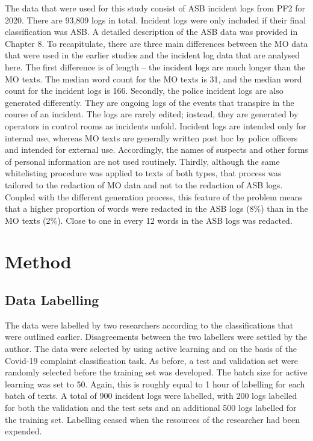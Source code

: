 The data that were used for this study consist of ASB incident logs from PF2 for 2020. There are 93,809 logs in total. Incident logs were only included if their final classification was ASB. A detailed description of the ASB data was provided in Chapter 8. To recapitulate, there are three main differences between the MO data that were used in the earlier studies and the incident log data that are analysed here. The first difference is of length – the incident logs are much longer than the MO texts. The median word count for the MO texts is 31, and the median word count for the incident logs is 166. Secondly, the police incident logs are also generated differently. They are ongoing logs of the events that transpire in the course of an incident. The logs are rarely edited; instead, they are generated by operators in control rooms as incidents unfold. Incident logs are intended only for internal use, whereas MO texts are generally written post hoc by police officers and intended for external use. Accordingly, the names of suspects and other forms of personal information are not used routinely. Thirdly, although the same whitelisting procedure was applied to texts of both types, that process was tailored to the redaction of MO data and not to the redaction of ASB logs. Coupled with the different generation process, this feature of the problem means that a higher proportion of words were redacted in the ASB logs (8\%) than in the MO texts (2\%). Close to one in every 12 words in the ASB logs was redacted.

\section{Method}


\subsection{Data Labelling} The data were labelled by two researchers according to the classifications that were outlined earlier. Disagreements between the two labellers were settled by the author. The data were selected by using active learning and on the basis of the Covid-19 complaint classification task. As before, a test and validation set were randomly selected before the training set was developed. The batch size for active learning was set to 50. Again, this is roughly equal to 1 hour of labelling for each batch of texts. A total of 900 incident logs were labelled, with 200 logs labelled for both the validation and the test sets and an additional 500 logs labelled for the training set. Labelling ceased when the resources of the researcher had been expended.

